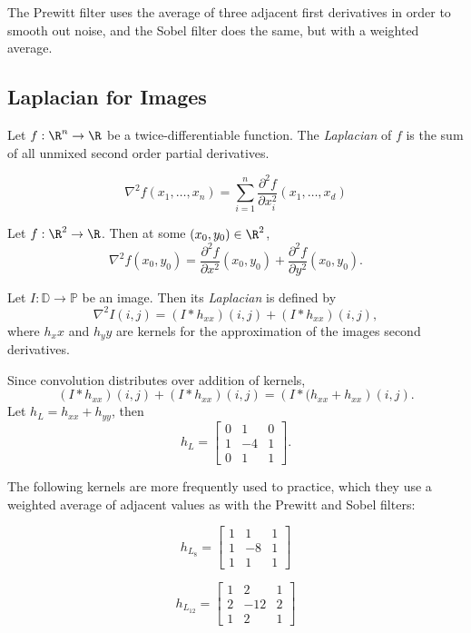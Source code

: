 \documentclass[12pt]{article}
\begin{document}
The Prewitt filter uses the average of three adjacent first derivatives in order to smooth out noise, and the Sobel filter does the same, but with a weighted average.

\subsection{Laplacian for Images}

\begin{defn}
    Let $f: \R^n \to \R$ be a twice-differentiable function. The \emph{Laplacian} of $f$ is the sum of all unmixed second order partial derivatives.

    \[\nabla^2f(x_1, \ldots, x_n) = \sum_{i=1}^n \frac{\partial^2f}{\partial x_i^2}(x_1, \ldots, x_d)\]
\end{defn}

\begin{exmp}
    Let $f: \R^2 \to \R$. Then at some $(x_0, y_0) \in \R^2$, \[\nabla^2 f(x_0, y_0) = \frac{\partial^2f}{\partial x^2}(x_0, y_0) + \frac{\partial^2f}{\partial y^2}(x_0, y_0).\]
\end{exmp}

\begin{defn}
    Let $I: \mathbb{D} \to \mathbb{P}$ be an image. Then its \emph{Laplacian} is defined by \[\nabla^2I(i, j) = (I * h_{xx})(i, j) + (I * h_{xx})(i, j),\] where $h_xx$ and $h_yy$ are kernels for the approximation of the images second derivatives.
\end{defn}

Since convolution distributes over addition of kernels, \[(I * h_{xx})(i, j) + (I * h_{xx})(i, j) = \left(I * (h_{xx} + h_{xx}\right)(i, j).\] Let $h_L = h_{xx} + h_{yy}$, then
\[h_L = \begin{bmatrix}
    0 & 1 & 0 \\ 1 & -4 & 1 \\ 0 & 1 & 1
\end{bmatrix}.\]

The following kernels are more frequently used to practice, which they use a weighted average of adjacent values as with the Prewitt and Sobel filters:

\[h_{L_8} = \begin{bmatrix}
    1 & 1 & 1 \\ 1 & -8 & 1 \\ 1 & 1 & 1
\end{bmatrix}\]

\[h_{L_12} = \begin{bmatrix}
    1 & 2 & 1 \\ 2 & -12 & 2 \\ 1 & 2 & 1
\end{bmatrix}\]
\end{document}
